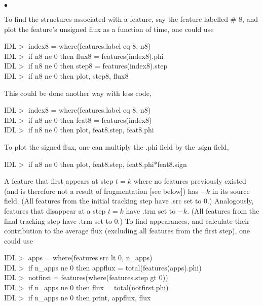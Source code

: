 \documentclass[12pt,preprint]{aastex}
\begin{document}
\begin{list}{$\bullet$}{}
%
\item To find the structures associated with a feature, say the
feature labelled \# 8, and plot the feature's unsigned flux as a function of
time, one could use
%
\par
\indent IDL$>$ index8 = where(features.label eq 8, n8) \\
\indent IDL$>$ if n8 ne 0 then flux8 = features(index8).phi \\
\indent IDL$>$ if n8 ne 0 then step8 = features(index8).step \\
\indent IDL$>$ if n8 ne 0 then plot, step8, flux8  \\
\par
%
This could be done another way with less code,
%
\par
\indent IDL$>$ index8 = where(features.label eq 8, n8) \\
\indent IDL$>$ if n8 ne 0 then feat8 = features(index8) \\
\indent IDL$>$ if n8 ne 0 then plot, feat8.step, feat8.phi  \\
\par
%
To plot the signed flux, one can multiply the .phi field by the .sign
field,
%
\par
\indent IDL$>$ if n8 ne 0 then plot, feat8.step, feat8.phi*feat8.sign  \\
\par
%
\item A feature that first appears at step $t = k$ where no features
previously existed (and is therefore not a result of fragmentation
[see below]) has $-k$ in its source field.  (All features from the
initial tracking step have .src set to 0.)  Analogously, features that
disappear at a step $t = k$ have .trm set to $-k$.  (All features from
the final tracking step have .trm set to 0.)  To find appearances, and
calculate their contribution to the average flux (excluding all
features from the first step), one could use
%
\par 
\indent IDL$>$ apps = where(features.src lt 0, n\_apps) \\ 
\indent IDL$>$ if n\_apps ne 0 then appflux = total(features(apps).phi)  \\
\indent IDL$>$ notfirst = features(where(features.step gt 0)) \\
\indent IDL$>$ if n\_apps ne 0 then flux = total(notfirst.phi) \\
\indent IDL$>$ if n\_apps ne 0 then print, appflux, flux \\

\end{list}
\end{document}
